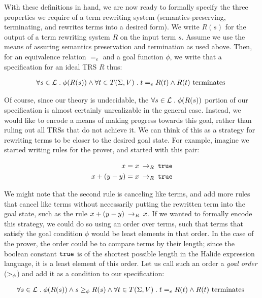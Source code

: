 With these definitions in hand, we are now ready to formally specify the three properties we require of a term rewriting system (semantics-preserving, terminating, and rewrites terms into a desired form). We write $R(s)$ for the output of a term rewriting system $R$ on the input term $s$. Assume we use the means of assuring semantics preservation and termination as used above. Then, for an equivalence relation $=_e$ and a goal function $\phi$, we write that a specification for an ideal TRS $R$ thus:

\begin{align*}
\forall s \in \mathcal{L} \;.\; \phi(R(s)) \wedge \forall t \in T(\Sigma,V) \;.\; t =_e R(t) \wedge R(t) \textrm{ terminates }
\end{align*}

Of course, since our theory is undecidable, the $\forall s \in \mathcal{L} \;.\; \phi(R(s))$ portion of our specification is almost certainly unrealizable in the general case. Instead, we would like to encode a means of making progress towards this goal, rather than ruling out all TRSs that do not achieve it. We can think of this as a strategy for rewriting terms to be closer to the desired goal state. For example, imagine we started writing rules for the prover, and started with this pair:

\begin{align*}
    x = x \:\rightarrow_{R}\: \texttt{true} \\
    x + (y - y) = x \:\rightarrow_{R}\: \texttt{true}
\end{align*}

We might note that the second rule is canceling like terms, and add more rules that cancel like terms without necessarily putting the rewritten term into the goal state, such as the rule $x + (y - y) \:\rightarrow_{R}\: x$. If we wanted to formally encode this strategy, we could do so using an order over terms, such that terms that satisfy the goal condition $\phi$ would be least elements in that order. In the case of the prover, the order could be to compare terms by their length; since the boolean constant $\texttt{true}$ is of the shortest possible length in the Halide expression language, it is a least element of this order. Let us call such an order a \emph{goal order} ($>_{\phi}$) and add it as a condition to our specification:

\begin{align*}
\forall s \in \mathcal{L} \;.\; \phi(R(s)) \wedge  s \geq_{\phi} R(s) \wedge \forall t \in T(\Sigma,V) \;.\; t =_e R(t) \wedge  R(t) \textrm{ terminates }
\end{align*}


